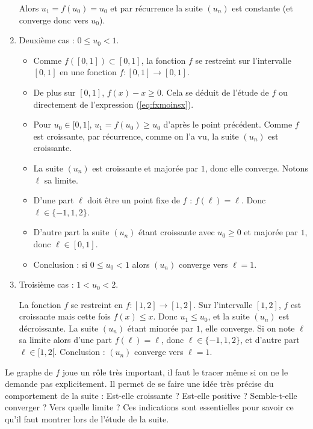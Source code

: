 \documentclass[class=report,crop=false]{standalone}
\begin{document}
\begin{exemple}
\begin{enumerate}
  Alors $u_1=f(u_0)=u_0$ et par récurrence la suite $(u_n)$ est constante (et converge
  donc vers $u_0$).

  \item Deuxième cas : $0 \le u_0 <1$.
  \begin{itemize}
    \item Comme $f([0,1])\subset [0,1]$, la fonction $f$ se restreint sur l'intervalle $[0,1]$ en une fonction
    $f : [0,1] \to [0,1]$.

    \item De plus sur $[0,1]$, $f(x)-x\ge0$. Cela se déduit de l'étude de $f$ ou
    directement de l'expression (\ref{eq:fxmoinsx}).

    \item Pour $u_0 \in [0,1[$, $u_1 = f(u_0) \ge u_0$ d'après le point précédent. Comme $f$ est croissante, par récurrence, comme on l'a vu, la suite $(u_n)$ est croissante.

    \item La suite $(u_n)$ est croissante et majorée par $1$, donc elle converge. Notons $\ell$ sa limite.

    \item D'une part $\ell$ doit être un point fixe de $f$ : $f(\ell)=\ell$. Donc $\ell \in \{-1,1,2\}$.

    \item D'autre part la suite $(u_n)$ étant croissante avec $u_0\ge0$ et majorée par $1$, donc $\ell \in [0,1]$.

    \item Conclusion : si $0\le u_0<1$ alors $(u_n)$ converge vers $\ell = 1$.
  \end{itemize}

  \item Troisième cas : $1 < u_0 < 2$.

  La fonction $f$ se restreint en $f : [1,2] \to [1,2]$. Sur l'intervalle $[1,2]$, $f$ est croissante
  mais cette fois $f(x) \le x$. Donc $u_1 \le u_0$, et la suite $(u_n)$ est décroissante.
  La suite $(u_n)$ étant minorée par $1$, elle converge. Si on note $\ell$ sa limite alors
  d'une part $f(\ell)=\ell$, donc $\ell \in \{-1,1,2\}$,
  et d'autre part $\ell \in [1,2[$. Conclusion : $(u_n)$ converge vers $\ell=1$.

\end{enumerate}


\end{exemple}



Le graphe de $f$ joue un rôle très important, il faut le tracer même si on ne le demande pas explicitement.
Il permet de se faire une idée très précise du comportement de la suite :
Est-elle croissante ? Est-elle positive ? Semble-t-elle converger ? Vers quelle limite ?
Ces indications sont essentielles pour savoir ce qu'il faut montrer lors de l'étude de la suite.
\end{document}
